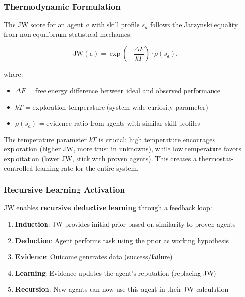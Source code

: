 \documentclass[11pt]{article}
\begin{document}
\subsubsection{Thermodynamic Formulation}

The JW score for an agent $a$ with skill profile $s_a$ follows the Jarzynski
equality from non-equilibrium statistical mechanics:

\begin{equation}
  \text{JW}(a) = \exp\left(-\frac{\Delta F}{kT}\right) \cdot \rho(s_a),
  \label{eq:jw}
\end{equation}

where:
\begin{itemize}[noitemsep,topsep=4pt]
  \item $\Delta F$ = free energy difference between ideal and observed performance
  \item $kT$ = exploration temperature (system-wide curiosity parameter)
  \item $\rho(s_a)$ = evidence ratio from agents with similar skill profiles
\end{itemize}

The temperature parameter $kT$ is crucial: high temperature encourages
exploration (higher JW, more trust in unknowns), while low temperature favors
exploitation (lower JW, stick with proven agents). This creates a
thermostat-controlled learning rate for the entire system.

\subsubsection{Recursive Learning Activation}

JW enables \textbf{recursive deductive learning} through a feedback loop:

\begin{enumerate}[noitemsep,topsep=4pt]
  \item \textbf{Induction}: JW provides initial prior based on similarity to proven agents
  \item \textbf{Deduction}: Agent performs task using the prior as working hypothesis
  \item \textbf{Evidence}: Outcome generates data (success/failure)
  \item \textbf{Learning}: Evidence updates the agent's reputation (replacing JW)
  \item \textbf{Recursion}: New agents can now use this agent in their JW calculation
\end{enumerate}
\end{document}
